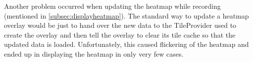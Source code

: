 \documentclass[10pt,a4paper]{article} %
\begin{document}
	Another problem occurred when updating the heatmap while recording (mentioned in \autoref{subsec:displayheatmap}).
	The standard way to update a heatmap overlay would be just to hand over the new data to the TileProvider used to create the overlay and then tell the overlay to clear its tile cache so that the updated data is loaded.
	Unfortunately, this caused flickering of the heatmap and ended up in displaying the heatmap in only very few cases.





    
    \nocite{*}
    
    
\end{document}
